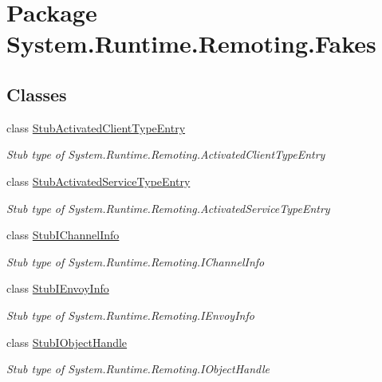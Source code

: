 \hypertarget{namespace_system_1_1_runtime_1_1_remoting_1_1_fakes}{\section{Package System.\-Runtime.\-Remoting.\-Fakes}
\label{namespace_system_1_1_runtime_1_1_remoting_1_1_fakes}
}
\subsection*{Classes}
\begin{DoxyCompactItemize}
\item 
class \hyperlink{class_system_1_1_runtime_1_1_remoting_1_1_fakes_1_1_stub_activated_client_type_entry}{Stub\-Activated\-Client\-Type\-Entry}
\begin{DoxyCompactList}\small\item\em Stub type of System.\-Runtime.\-Remoting.\-Activated\-Client\-Type\-Entry\end{DoxyCompactList}\item 
class \hyperlink{class_system_1_1_runtime_1_1_remoting_1_1_fakes_1_1_stub_activated_service_type_entry}{Stub\-Activated\-Service\-Type\-Entry}
\begin{DoxyCompactList}\small\item\em Stub type of System.\-Runtime.\-Remoting.\-Activated\-Service\-Type\-Entry\end{DoxyCompactList}\item 
class \hyperlink{class_system_1_1_runtime_1_1_remoting_1_1_fakes_1_1_stub_i_channel_info}{Stub\-I\-Channel\-Info}
\begin{DoxyCompactList}\small\item\em Stub type of System.\-Runtime.\-Remoting.\-I\-Channel\-Info\end{DoxyCompactList}\item 
class \hyperlink{class_system_1_1_runtime_1_1_remoting_1_1_fakes_1_1_stub_i_envoy_info}{Stub\-I\-Envoy\-Info}
\begin{DoxyCompactList}\small\item\em Stub type of System.\-Runtime.\-Remoting.\-I\-Envoy\-Info\end{DoxyCompactList}\item 
class \hyperlink{class_system_1_1_runtime_1_1_remoting_1_1_fakes_1_1_stub_i_object_handle}{Stub\-I\-Object\-Handle}
\begin{DoxyCompactList}\small\item\em Stub type of System.\-Runtime.\-Remoting.\-I\-Object\-Handle\end{DoxyCompactList}\item 

\end{DoxyCompactItemize}
